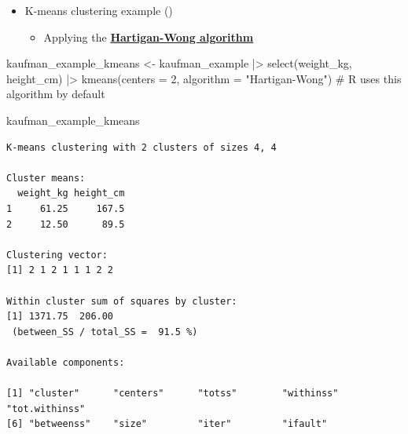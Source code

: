 \documentclass[
  ignorenonframetext,
]{beamer}
\newenvironment{Shaded}{\begin{snugshade}}{\end{snugshade}}
\newcommand{\AttributeTok}[1]{\textcolor[rgb]{0.40,0.45,0.13}{#1}}
\newcommand{\CommentTok}[1]{\textcolor[rgb]{0.37,0.37,0.37}{#1}}
\newcommand{\DecValTok}[1]{\textcolor[rgb]{0.68,0.00,0.00}{#1}}
\newcommand{\FunctionTok}[1]{\textcolor[rgb]{0.28,0.35,0.67}{#1}}
\newcommand{\NormalTok}[1]{\textcolor[rgb]{0.00,0.23,0.31}{#1}}
\newcommand{\OtherTok}[1]{\textcolor[rgb]{0.00,0.23,0.31}{#1}}
\newcommand{\SpecialCharTok}[1]{\textcolor[rgb]{0.37,0.37,0.37}{#1}}
\newcommand{\StringTok}[1]{\textcolor[rgb]{0.13,0.47,0.30}{#1}}
\providecommand{\tightlist}{%
  \setlength{\itemsep}{0pt}\setlength{\parskip}{0pt}}\usepackage{longtable,booktabs,array}
\begin{document}
\begin{frame}[fragile]{}
\label{section-43}
\begin{itemize}
\item
  K-means clustering example
  ()

  \begin{itemize}
  \tightlist
  \item
    Applying the
    \href{https://en.wikipedia.org/wiki/K-means_clustering}{\textbf{Hartigan-Wong
    algorithm}}
  \end{itemize}
\end{itemize}

\tiny

\begin{Shaded}
\begin{Highlighting}[]
\NormalTok{kaufman\_example\_kmeans }\OtherTok{\textless{}{-}}\NormalTok{ kaufman\_example }\SpecialCharTok{|\textgreater{}} 
  \FunctionTok{select}\NormalTok{(weight\_kg, height\_cm) }\SpecialCharTok{|\textgreater{}} 
  \FunctionTok{kmeans}\NormalTok{(}\AttributeTok{centers =} \DecValTok{2}\NormalTok{, }
         \AttributeTok{algorithm =} \StringTok{"Hartigan{-}Wong"}\NormalTok{) }\CommentTok{\# R uses this algorithm by default}

\NormalTok{kaufman\_example\_kmeans}
\end{Highlighting}
\end{Shaded}

\begin{verbatim}
K-means clustering with 2 clusters of sizes 4, 4

Cluster means:
  weight_kg height_cm
1     61.25     167.5
2     12.50      89.5

Clustering vector:
[1] 2 1 2 1 1 1 2 2

Within cluster sum of squares by cluster:
[1] 1371.75  206.00
 (between_SS / total_SS =  91.5 %)

Available components:

[1] "cluster"      "centers"      "totss"        "withinss"     "tot.withinss"
[6] "betweenss"    "size"         "iter"         "ifault"      
\end{verbatim}
\end{frame}
\end{document}
